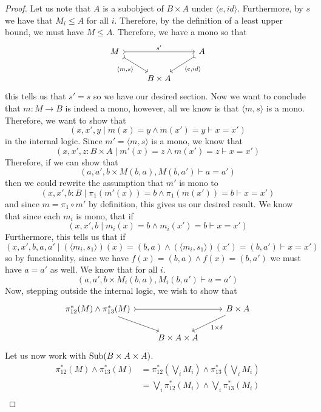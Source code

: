 \begin{proof}
  Let us note that $A$ is a subobject of $B \times A$ under
  $\langle e, id \rangle$. Furthermore, by $s$ we have that
  $M_i \le A$ for all $i$. Therefore, by the definition of a least
  upper bound, we must have $M \le A$. Therefore, we have a mono so
  that
  \[
    \begin{tikzcd}
      M \ar[rr, rightarrowtail, "s'"] \ar[dr, swap, rightarrowtail, "{\langle m, s \rangle}"] &&
      A \ar[dl, rightarrowtail, "{\langle e, id \rangle}"]\\
      &B \times A&
    \end{tikzcd}
  \]
  this tells us that $s' = s$ so we have our desired section. Now we
  want to conclude that $m : M \to B$ is indeed a mono, however, all
  we know is that $\langle m, s \rangle$ is a mono. Therefore, we want
  to show that
  \[
    (x, x', y \mid m(x) = y \wedge m(x') = y \vdash x = x')
  \]
  in the internal logic. Since $m' = \langle m, s \rangle$ is a mono,
  we know that
  \[
    (x, x', z : B \times A \mid m'(x) = z \wedge m(x') = z \vdash x = x')
  \]
  Therefore, if we can show that
  \[
    (a, a', b \times M(b, a), M(b, a') \vdash a = a')
  \]
  then we could rewrite the assumption that $m'$ is mono to
  \[
    (x, x', b : B \mid \pi_1(m'(x)) = b \wedge \pi_1(m(x')) = b \vdash x = x')
  \]
  and since $m = \pi_1 \circ m'$ by definition, this gives us our
  desired result. We know that since each $m_i$ is mono, that if
  \[
    (x, x', b \mid m_i(x) = b \wedge m_i(x') = b \vdash x = x')
  \]
  Furthermore, this tells us that if
  \[
    (x, x', b, a, a' \mid (\langle m_i, s_1 \rangle)(x) = (b, a) \wedge
    (\langle m_i, s_1 \rangle)(x') = (b, a') \vdash x = x')
  \]
  so by functionality, since we have
  $f(x) = (b, a) \wedge f(x) = (b, a')$ we must have $a = a'$ as
  well. We know that for all $i$.
  \[
    (a, a', b \times M_i(b, a), M_i(b, a') \vdash a = a')
  \]
  Now, stepping outside the internal logic, we wish to show that
  \[
    \begin{tikzcd}
      {\pi_{12}^*(M) \wedge \pi_{13}^*(M)} \ar[dr] \ar[rr, rightarrowtail] & &
      {B \times A} \ar[ld, "{1 \times \delta}"]\\
      &{B \times A \times A}&
    \end{tikzcd}
  \]
  Let us now work with $\operatorname{Sub}(B \times A \times A)$.
  \begin{align*}
    \pi_{12}^*(M) \wedge \pi_{13}^*(M) &= \pi_{12}^*(\bigvee_i M_i) \wedge \pi_{13}^*(\bigvee_i M_i)\\
      &= \bigvee_i \pi_{12}^*(M_i) \wedge \bigvee_i \pi_{13}^*(M_i)\\

\end{align*}
\end{proof}
